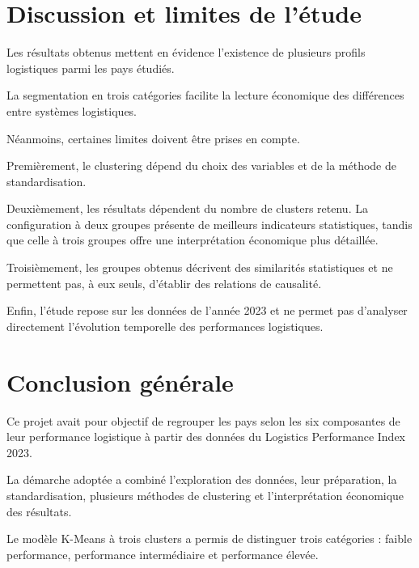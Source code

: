 \documentclass[11pt,a4paper]{article}
\begin{document}

\section{Discussion et limites de l'étude}

Les résultats obtenus mettent en évidence l'existence de
plusieurs profils logistiques parmi les pays étudiés.

La segmentation en trois catégories facilite la lecture
économique des différences entre systèmes logistiques.

Néanmoins, certaines limites doivent être prises en compte.

Premièrement, le clustering dépend du choix des variables
et de la méthode de standardisation.

Deuxièmement, les résultats dépendent du nombre de clusters
retenu. La configuration à deux groupes présente de meilleurs
indicateurs statistiques, tandis que celle à trois groupes
offre une interprétation économique plus détaillée.

Troisièmement, les groupes obtenus décrivent des similarités
statistiques et ne permettent pas, à eux seuls, d'établir
des relations de causalité.

Enfin, l'étude repose sur les données de l'année 2023 et
ne permet pas d'analyser directement l'évolution temporelle
des performances logistiques.


\section*{Conclusion générale}

Ce projet avait pour objectif de regrouper les pays selon
les six composantes de leur performance logistique à partir
des données du Logistics Performance Index 2023.

La démarche adoptée a combiné l'exploration des données,
leur préparation, la standardisation, plusieurs méthodes
de clustering et l'interprétation économique des résultats.

Le modèle K-Means à trois clusters a permis de distinguer
trois catégories : faible performance, performance
intermédiaire et performance élevée.
\end{document}
